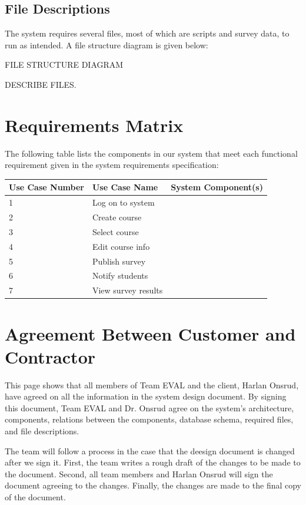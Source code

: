 \documentclass{article}
\begin{document}
\subsection{File Descriptions}

The system requires several files, most of which are scripts and survey data, to run as intended. A file structure diagram is given below:

FILE STRUCTURE DIAGRAM

DESCRIBE FILES.

\section{Requirements Matrix}

The following table lists the components in our system that meet each functional requirement given in the system requirements specification:

\begin{center}
\begin{tabular}{|p{3.2cm}|p{3.2cm}|p{6cm}|} 
\hline
\textbf{Use Case Number} & \textbf{Use Case Name} & \textbf{System Component(s)} \\
\hline
1 & Log on to system & \\ 
\hline
2 & Create course & \\ 
\hline
3 & Select course & \\ 
\hline
4 & Edit course info & \\ 
\hline
5 & Publish survey & \\ 
\hline
6 & Notify students & \\ 
\hline
7 & View survey results & \\ 
\hline
\end{tabular}
\end{center}

\appendix

\newpage
\section{Agreement Between Customer and Contractor}
This page shows that all members of Team EVAL and the client, Harlan Onsrud, have agreed on all the information in the system design document. By signing this document, Team EVAL and Dr. Onsrud agree on the system's architecture, components, relations between the components, database schema, required files, and file descriptions.

The team will follow a process in the case that the deesign document is changed after we sign it. First, the team writes a rough draft of the changes to be made to the document. Second, all team members and Harlan Onsrud will sign the document agreeing to the changes. Finally, the changes are made to the final copy of the document.
\end{document}
